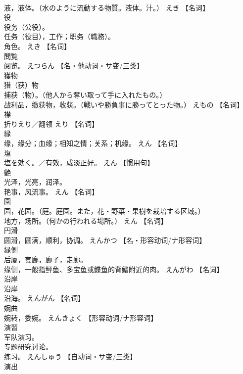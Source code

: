 \documentclass[8pt]{extreport}
\begin{document}
\begin{CJK}{UTF8}{min}
\\	液，液体。（水のように流動する物質。液体。汁。）	えき		【名词】
\\	役	
\\	役务（公役）。 
\\	任务（役目），工作；职务（職務）。 
\\	角色。	えき		【名词】
\\	閲覧	
\\	阅览。	えつらん		【名・他动词・サ变/三类】
\\	獲物	
\\	猎（获）物
\\	捕获（物）。（他人から奪い取って手に入れたもの。） 
\\	战利品，缴获物，收获。（戦いや勝負事に勝ってとった物。）	えもの		【名词】
\\	襟	
\\	折りえり／翻领	えり		【名词】
\\	縁	
\\	缘，缘分；血缘；相知之情；关系；机缘。	えん		【名词】
\\	塩	
\\	塩を効く。／有效，咸淡正好。	えん		【惯用句】
\\	艶	
\\	光泽，光亮，润泽。 
\\	艳事，风流事。	えん		【名词】
\\	園	
\\	园，花园。（庭。庭園。また，花・野菜・果樹を栽培する区域。） 
\\	地方，场所。（何かの行われる場所。）	えん		【名词】
\\	円滑	
\\	圆滑，圆满，顺利，协调。	えんかつ		【名・形容动词/ナ形容词】
\\	縁側	
\\	后厦，套廊，廊子，走廊。 
\\	缘侧，一般指鲆鱼、多宝鱼或鲽鱼的背鳍附近的肉。	えんがわ		【名词】
\\	沿岸	
\\	沿岸
\\	沿海。	えんがん		【名词】
\\	婉曲	
\\	婉转，委婉。	えんきょく		【形容动词/ナ形容词】
\\	演習	
\\	军队演习。 
\\	专题研究讨论。 
\\	练习。	えんしゅう		【自动词・サ变/三类】
\\	演出	

\end{CJK}
\end{document}
